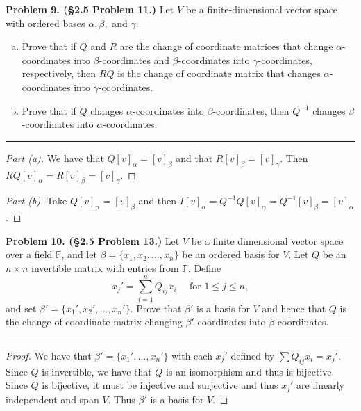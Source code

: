 \documentclass[leqno]{article}
\theoremstyle{nonumberplain}
\newtheorem{proof}{Proof}
\begin{document}
\noindent\textbf{Problem 9. (\S 2.5 Problem 11.)} Let $V$ be a finite-dimensional vector space with ordered bases $\alpha,\beta,$ and $\gamma$.
\begin{enumerate}[(a)]
\item Prove that if $Q$ and $R$ are the change of coordinate matrices that change $\alpha$-coordinates into $\beta$-coordinates and $\beta$-coordinates into $\gamma$-coordinates, respectively, then $RQ$ is the change of coordinate matrix that changes $\alpha$-coordinates into $\gamma$-coordinates.
\item Prove that if $Q$ changes $\alpha$-coordinates into $\beta$-coordinates, then $Q^{-1}$ changes $\beta$-coordinates into $\alpha$-coordinates.
\end{enumerate}


\noindent\rule[0.5ex]{\linewidth}{1pt}

\begin{proof}[Part (a)]
We have that $Q[v]_\alpha=[v]_\beta$ and that $R[v]_\beta=[v]_\gamma$. Then $RQ[v]_\alpha=R[v]_\beta=[v]_\gamma$.
\end{proof}

\begin{proof}[Part (b)]
Take $Q[v]_\alpha=[v]_\beta$ and then $I[v]_\alpha=Q^{-1}Q[v]_\alpha=Q^{-1}[v]_\beta=[v]_\alpha$.
\end{proof}

\pagebreak



\noindent\textbf{Problem 10. (\S 2.5 Problem 13.)} Let $V$ be a finite dimensional vector space over a field $\mathbb{F}$, and let $\beta=\{x_1,x_2,...,x_n\}$ be an ordered basis for $V$. Let $Q$ be an $n\times n$ invertible matrix with entries from $\mathbb{F}$. Define
\[
x_j'=\sum_{i=1}^n Q_{ij}x_i \textrm{~~~ for } 1\le j \le n,
\]
and set $\beta'=\{x_1',x_2',...,x_n'\}$. Prove that $\beta'$ is a basis for $V$ and hence that $Q$ is the change of coordinate matrix changing $\beta'$-coordinates into $\beta$-coordinates.

\noindent\rule[0.5ex]{\linewidth}{1pt}

\begin{proof}
We have that $\beta'=\{x_1',...,x_n'\}$ with each $x_j'$ defined by $\sum Q_{ij}x_i=x_j'$.  Since $Q$ is invertible, we have that $Q$ is an isomorphism and thus is bijective.  Since $Q$ is bijective, it must be injective and surjective and thus $x_j'$ are linearly independent and span $V$.  Thus $\beta'$ is a basis for $V$.
\end{proof}

\pagebreak
\end{document}
